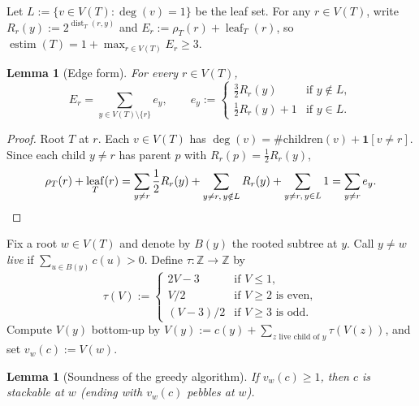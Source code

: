\documentclass[11pt]{article}
\newtheorem{lemma}[theorem]{Lemma}
\DeclareMathOperator{\estim}{estim}
\DeclareMathOperator{\dist}{dist}
\DeclareMathOperator{\leaf}{leaf}
\begin{document}
Let $L := \{v \in V(T) : \deg(v) = 1\}$ be the leaf set. For any $r \in V(T)$, write $R_r(y) := 2^{\dist_T(r,y)}$ and $E_r := \rho_T(r) + \leaf_T(r)$, so $\estim(T) = 1 + \max_{r \in V(T)} E_r \ge 3$.

\begin{lemma}[Edge form]\label{lem:A}
For every $r \in V(T)$,
\[
E_r = \sum_{y \in V(T) \setminus \{r\}} e_y, \qquad
e_y := \begin{cases}
\frac{3}{2} R_r(y) & \text{if } y \notin L, \\
\frac{1}{2} R_r(y) + 1 & \text{if } y \in L.
\end{cases}
\]
\end{lemma}

\begin{proof}
Root $T$ at $r$. Each $v \in V(T)$ has $\deg(v) = \#\mathrm{children}(v) + \mathbf{1}[v \neq r]$. Since each child $y \neq r$ has parent $p$ with $R_r(p) = \frac{1}{2} R_r(y)$,
\[
\rho_T(r) + \leaf_T(r) = \sum_{y \neq r} \frac{1}{2} R_r(y) + \sum_{y \neq r,\, y \notin L} R_r(y) + \sum_{y \neq r,\, y \in L} 1 = \sum_{y \neq r} e_y. \qedhere
\]
\end{proof}

Fix a root $w \in V(T)$ and denote by $B(y)$ the rooted subtree at $y$. Call $y \neq w$ \emph{live} if $\sum_{u \in B(y)} c(u) > 0$. Define $\tau : \mathbb{Z} \to \mathbb{Z}$ by
\[
\tau(V) := \begin{cases}
2V - 3 & \text{if } V \le 1, \\
V/2 & \text{if } V \ge 2 \text{ is even}, \\
(V - 3)/2 & \text{if } V \ge 3 \text{ is odd}.
\end{cases}
\]
Compute $V(y)$ bottom-up by $V(y) := c(y) + \sum_{z \text{ live child of } y} \tau(V(z))$, and set $v_w(c) := V(w)$.

\begin{lemma}[Soundness of the greedy algorithm]\label{lem:B}
If $v_w(c) \ge 1$, then $c$ is stackable at $w$ (ending with $v_w(c)$ pebbles at $w$).
\end{lemma}
\end{document}
